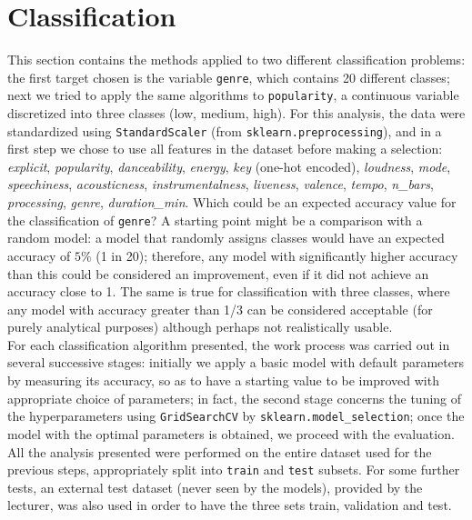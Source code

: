 \chapter*{Classification} %
\vspace{-10mm}
This section contains the methods applied to two different classification problems: the first target chosen is the variable \texttt{genre}, which contains 20 different classes; next we tried to apply the same algorithms to \texttt{popularity}, a continuous variable discretized into three classes (low, medium, high). For this analysis, the data were standardized using \texttt{StandardScaler} (from \texttt{sklearn.preprocessing}), and in a first step we chose to use all features in the dataset before making a selection: \textit{explicit}, \textit{popularity}, \textit{danceability}, \textit{energy}, \textit{key} (one-hot encoded), \textit{loudness}, \textit{mode}, \textit{speechiness}, \textit{acousticness}, \textit{instrumentalness}, \textit{liveness}, \textit{valence}, \textit{tempo}, \textit{n\_bars}, \textit{processing}, \textit{genre}, \textit{duration\_min}. Which could be an expected accuracy value for the classification of \texttt{genre}? A starting point might be a comparison with a random model: a model that randomly assigns classes would have an expected accuracy of $5\%$ (1 in 20); therefore, any model with significantly higher accuracy than this could be considered an improvement, even if it did not achieve an accuracy close to 1. The same is true for classification with three classes, where any model with accuracy greater than 1/3 can be considered acceptable (for purely analytical purposes) although perhaps not realistically usable.\\
For each classification algorithm presented, the work process was carried out in several successive stages: initially we apply a basic model with default parameters by measuring its accuracy, so as to have a starting value to be improved with appropriate choice of parameters; in fact, the second stage concerns the tuning of the hyperparameters using \texttt{GridSearchCV} by \texttt{sklearn.model\_selection}; once the model with the optimal parameters is obtained, we proceed with the evaluation. All the analysis presented were performed on the entire dataset used for the previous steps, appropriately split into \texttt{train} and \texttt{test} subsets. For some further tests, an external test dataset (never seen by the models), provided by the lecturer, was also used in order to have the three sets train, validation and test.
